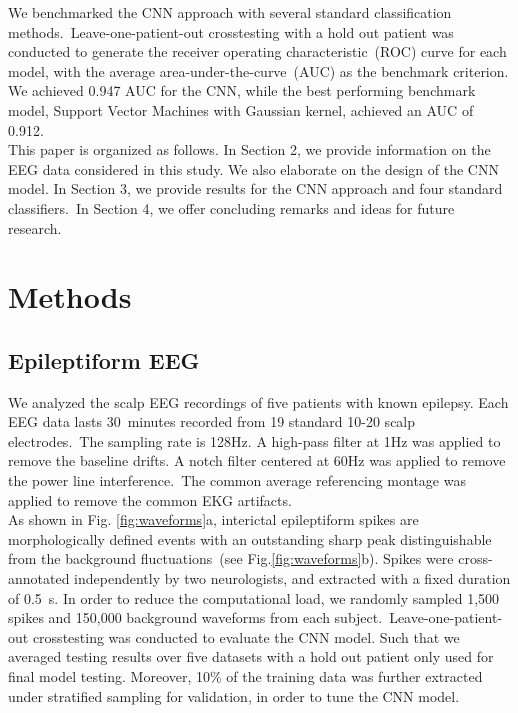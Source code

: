 \documentclass{article}
\begin{document}
We benchmarked the CNN approach with several standard classification methods.~Leave-one-patient-out crosstesting with a hold out patient was conducted to generate the receiver operating characteristic~(ROC) curve for each model, with the average area-under-the-curve~(AUC) as the benchmark criterion. We achieved 0.947 AUC for the CNN, while the best performing benchmark model, Support Vector Machines with Gaussian kernel, achieved an AUC of 0.912.
\\

This paper is organized as follows. In Section 2, we provide information on the EEG data considered in this study. We also elaborate on the design of the CNN model. In Section 3, we provide results for the CNN approach and four standard classifiers.~In Section 4, we offer concluding remarks and ideas for future research. \\

\section{Methods}
\subsection{Epileptiform EEG}
We analyzed the scalp EEG recordings of five patients with known epilepsy. Each EEG data lasts 30~minutes recorded from 19 standard 10-20 scalp electrodes.~The sampling rate is 128Hz. A high-pass filter at 1Hz was applied to remove the baseline drifts. A notch filter centered at 60Hz was applied to remove the power line interference.~The common average referencing montage was applied to remove the common EKG artifacts.\\

As shown in Fig. \ref{fig:waveforms}a, interictal epileptiform spikes are morphologically defined events with an outstanding sharp peak distinguishable from the background fluctuations~(see Fig.\ref{fig:waveforms}b). Spikes were cross-annotated independently by two neurologists, and extracted with a fixed duration of 0.5~s. In order to reduce the computational load, we randomly sampled 1,500 spikes and 150,000 background waveforms from each subject.~Leave-one-patient-out crosstesting was conducted to evaluate the CNN model. Such that we averaged testing results over five datasets with a hold out patient only used for final model testing. Moreover, 10\% of the training data was further extracted under stratified sampling for validation, in order to tune the CNN model.\\
\end{document}
